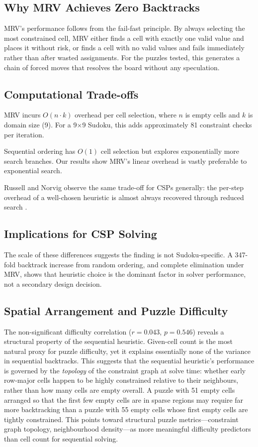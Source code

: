 \documentclass[conference]{IEEEtran}
\begin{document}
\subsection{Why MRV Achieves Zero Backtracks}

MRV's performance follows from the fail-fast principle. By always selecting the most constrained cell, MRV either finds a cell with exactly one valid value and places it without risk, or finds a cell with no valid values and fails immediately rather than after wasted assignments. For the puzzles tested, this generates a chain of forced moves that resolves the board without any speculation.

\subsection{Computational Trade-offs}

MRV incurs $O(n \cdot k)$ overhead per cell selection, where $n$ is empty cells and $k$ is domain size (9). For a 9×9 Sudoku, this adds approximately 81 constraint checks per iteration.

Sequential ordering has $O(1)$ cell selection but explores exponentially more search branches. Our results show MRV's linear overhead is vastly preferable to exponential search.

Russell and Norvig observe the same trade-off for CSPs generally: the per-step overhead of a well-chosen heuristic is almost always recovered through reduced search \cite{russell_norvig}.

\subsection{Implications for CSP Solving}

The scale of these differences suggests the finding is not Sudoku-specific. A 347-fold backtrack increase from random ordering, and complete elimination under MRV, shows that heuristic choice is the dominant factor in solver performance, not a secondary design decision.

\subsection{Spatial Arrangement and Puzzle Difficulty}

The non-significant difficulty correlation ($r=0.043$, $p=0.546$) reveals a structural property of the sequential heuristic. Given-cell count is the most natural proxy for puzzle difficulty, yet it explains essentially none of the variance in sequential backtracks. This suggests that the sequential heuristic's performance is governed by the \emph{topology} of the constraint graph at solve time: whether early row-major cells happen to be highly constrained relative to their neighbours, rather than how many cells are empty overall. A puzzle with 51 empty cells arranged so that the first few empty cells are in sparse regions may require far more backtracking than a puzzle with 55 empty cells whose first empty cells are tightly constrained. This points toward structural puzzle metrics---constraint graph topology, neighbourhood density---as more meaningful difficulty predictors than cell count for sequential solving.
\end{document}
